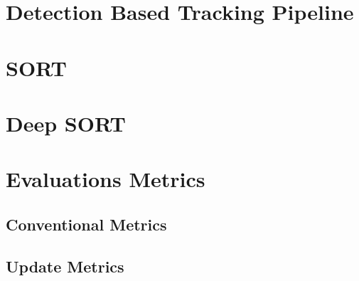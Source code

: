 \section{Detection Based Tracking Pipeline}

\section{SORT}

\section{Deep SORT}

\section{Evaluations Metrics}

    \subsection{Conventional Metrics}

    \subsection{Update Metrics}